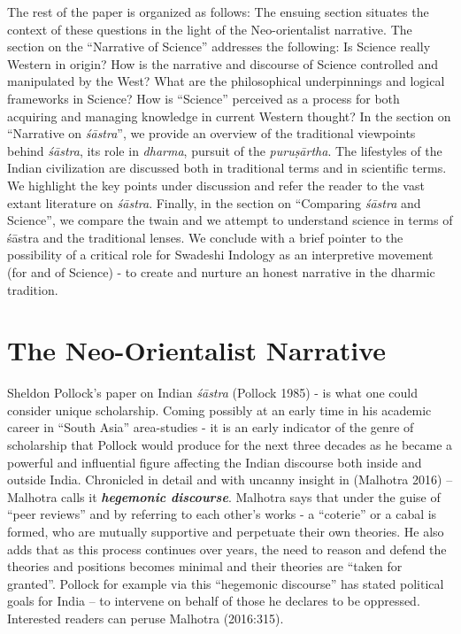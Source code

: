 The rest of the paper is organized as follows: The ensuing section situates the context of these questions in the light of the Neo-orientalist narrative. The section on the “Narrative of Science” addresses the following: Is Science really Western in origin? How is the narrative and discourse of Science controlled and manipulated by the West? What are the philosophical underpinnings and logical frameworks in Science? How is “Science” perceived as a process for both acquiring and managing knowledge in current Western thought? In the section on “Narrative on \textit{śāstra}”, we provide an overview of the traditional viewpoints behind \textit{śāstra}, its role in \textit{dharma}, pursuit of the \textit{puruṣārtha}. The lifestyles of the Indian civilization are discussed both in traditional terms and in scientific terms. We highlight the key points under discussion and refer the reader to the vast extant literature on \textit{śāstra}. Finally, in the section on “Comparing \textit{śāstra} and Science”, we compare the twain and we attempt to understand science in terms of śāstra and the traditional lenses. We conclude with a brief pointer to the possibility of a critical role for Swadeshi Indology as an interpretive movement (for and of Science) - to create and nurture an honest narrative in the dharmic tradition.


\section*{The Neo-Orientalist Narrative}

Sheldon Pollock’s paper on Indian \textit{śāstra} (Pollock 1985) - is what one could consider unique scholarship. Coming possibly at an early time in his academic career in “South Asia” area-studies - it is an early indicator of the genre of scholarship that Pollock would produce for the next three decades as he became a powerful and influential figure affecting the Indian discourse both inside and outside India. Chronicled in detail and with uncanny insight in (Malhotra 2016) – Malhotra calls it \textbf{\textit{hegemonic discourse}}. Malhotra says that under the guise of “peer reviews” and by referring to each other’s works - a “coterie” or a cabal is formed, who are mutually supportive and perpetuate their own theories. He also adds that as this process continues over years, the need to reason and defend the theories and positions becomes minimal and their theories are “taken for granted”. Pollock for example via this “hegemonic discourse” has stated political goals for India – to intervene on behalf of those he declares to be oppressed. Interested readers can peruse Malhotra (2016:315).

